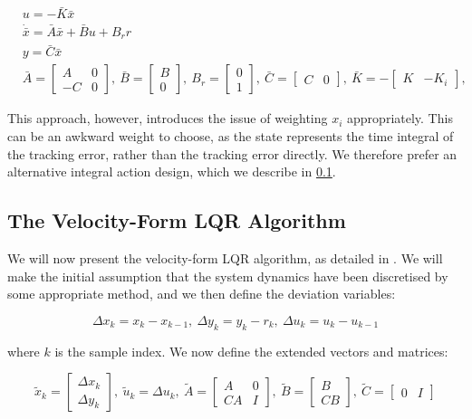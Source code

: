 \begin{align}\label{eq:ClassicalIntegralAction}
&u = -\bar{K}\bar{x} \\
&\dot{\bar{x}} = \bar{A}\bar{x} + \bar{B}u + B_r r \\ 
&y = \bar{C}\bar{x} \\
&\bar{A} = \begin{bmatrix}A & 0 \\ -C & 0 \end{bmatrix}, \ \bar{B} = \begin{bmatrix} B \\ 0 \end{bmatrix}, \ B_r = \begin{bmatrix} 0 \\ 1 \end{bmatrix}, \ \bar{C} = \begin{bmatrix} C & 0 \end{bmatrix},
\ \bar{K} = -\begin{bmatrix} K & -K_i \end{bmatrix},
\end{align}

This approach, however, introduces the issue of weighting $x_i$ appropriately. This can be an awkward weight to choose, as the state represents the time integral of the tracking error, rather than the tracking error directly. We therefore prefer an alternative integral action design, which we describe in \cref{subsec:VelocityFormLQR}.

\subsection{The Velocity-Form LQR Algorithm}\label{subsec:VelocityFormLQR}

We will now present the velocity-form LQR algorithm, as detailed in \cite{Pannocchia2001,Ruscio2012}. We will make the initial assumption that the system dynamics have been discretised by some appropriate method, and we then define the deviation variables:

\begin{equation}\label{eq:VelocityVariables}
	\Delta x_k = x_k - x_{k-1}, \ \Delta y_k = y_k - r_k, \ \Delta u_k = u_k-u_{k-1}
\end{equation}

where $k$ is the sample index. We now define the extended vectors and matrices:

\begin{equation}\label{eq:VelocityMatrices}
	\tilde{x}_k = \begin{bmatrix} \Delta x_k \\ \Delta y_k	\end{bmatrix}, \ \tilde{u}_k = \Delta u_k, \
	\tilde{A} = \begin{bmatrix} A & 0 \\ CA & I	\end{bmatrix}, \ 
	\tilde{B} = \begin{bmatrix} B \\ CB	\end{bmatrix}, \ \tilde{C} = \begin{bmatrix} 0 & I	\end{bmatrix}
\end{equation}

